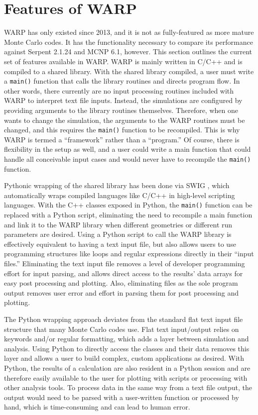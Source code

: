 \documentclass[preprint,12pt]{elsarticle}
\begin{document}
\section{Features of WARP}
\label{sec:features}

WARP has only existed since 2013, and it is not as fully-featured as more mature Monte Carlo codes.  It has the functionality necessary to compare its performance against Serpent 2.1.24 and MCNP 6.1, however.  This section outlines the current set of features available in WARP.  WARP is mainly written in C/C++ and is compiled to a shared library.  With the shared library compiled, a user must write a \texttt{main()} function that calls the library routines and directs program flow.  In other words, there currently are no input processing routines included with WARP to interpret text file inputs.  Instead, the simulations are configured by providing arguments to the library routines themselves.  Therefore, when one wants to change the simulation, the arguments to the WARP routines must be changed, and this requires the \texttt{main()} function to be recompiled.  This is why WARP is termed a ``framework'' rather than a ``program.''  Of course, there is flexibility in the setup as well, and a user could write a main function that could handle all conceivable input cases and would never have to recompile the \texttt{main()} function.  

Pythonic wrapping of the shared library has been done via SWIG \cite{python,swig}, which automatically wraps compiled languages like C/C++ in high-level scripting languages.  With the C++ classes exposed in Python, the \texttt{main()} function can be replaced with a Python script, eliminating the need to recompile a main function and link it to the WARP library when different geometries or different run parameters are desired.  Using a Python script to call the WARP library is effectively equivalent to having a text input file, but also allows users to use programming structures like loops and regular expressions directly in their ``input files.'' Eliminating the text input file removes a level of developer programming effort for input parsing, and allows direct access to the results' data arrays for easy post processing and plotting.  Also, eliminating files as the sole program output removes user error and effort in parsing them for post processing and plotting.  

The Python wrapping approach deviates from the standard flat text input file structure that many Monte Carlo codes use.  Flat text input/output relies on keywords  and/or regular formatting, which adds a layer between simulation and analysis.  Using Python to directly access the classes and their data removes this layer and allows a user to build complex, custom applications as desired.  With Python, the results of a calculation are also resident in a Python session and are therefore easily available to the user for plotting with scripts or processing with other analysis tools.  To process data in the same way from a text file output, the output would need to be parsed with a user-written function or processed by hand, which is time-consuming and can lead to human error.
\end{document}
